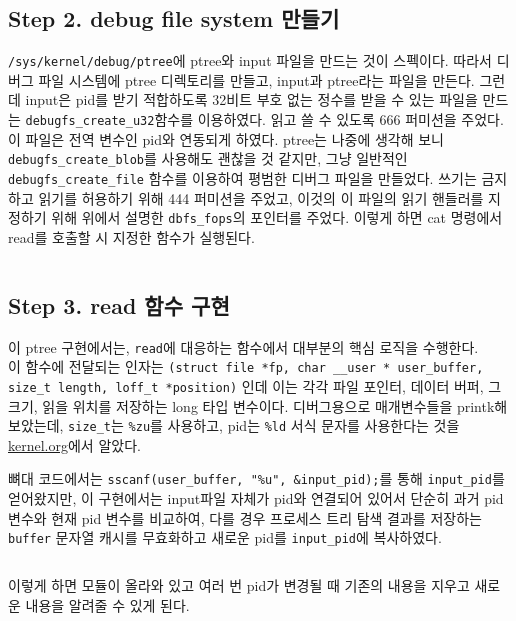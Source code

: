 \documentclass{report}
\begin{document}
\inputminted[firstline=147,lastline=147, linenos, breaklines]{C}{../kernellab-handout-done/ptree/dbfs_ptree.c}
\inputminted[firstline=125,lastline=128, linenos, breaklines]{C}{../kernellab-handout-done/ptree/dbfs_ptree.c}

\subsection{Step 2. debug file system 만들기}
\lstinline{/sys/kernel/debug/ptree}에 ptree와 input 파일을 만드는 것이 스펙이다. 따라서 디버그 파일 시스템에 ptree 디렉토리를 만들고, input과 ptree라는 파일을 만든다. 그런데 input은 pid를 받기 적합하도록 32비트 부호 없는 정수를 받을 수 있는 파일을 만드는 \lstinline{debugfs_create_u32}함수를 이용하였다. 읽고 쓸 수 있도록 666 퍼미션을 주었다. 이 파일은 전역 변수인 pid와 연동되게 하였다. ptree는 나중에 생각해 보니 \lstinline{debugfs_create_blob}를 사용해도 괜찮을 것 같지만, 그냥 일반적인 \lstinline{debugfs_create_file} 함수를 이용하여 평범한 디버그 파일을 만들었다. 쓰기는 금지하고 읽기를 허용하기 위해 444 퍼미션을 주었고, 이것의 이 파일의 읽기 핸들러를 지정하기 위해 위에서 설명한 \lstinline{dbfs_fops}의 포인터를 주었다. 이렇게 하면 cat 명령에서 read를 호출할 시 지정한 함수가 실행된다.

\inputminted[firstline=130,lastline=157, linenos, breaklines]{C}{../kernellab-handout-done/ptree/dbfs_ptree.c}

\subsection{Step 3. read 함수 구현}
이 ptree 구현에서는, \lstinline{read}에 대응하는 함수에서 대부분의 핵심 로직을 수행한다. \\
이 함수에 전달되는 인자는 \lstinline{(struct file *fp, char __user * user_buffer, size_t length, loff_t *position)} 인데 이는 각각 파일 포인터, 데이터 버퍼, 그 크기, 읽을 위치를 저장하는 long 타입 변수이다. 디버그용으로 매개변수들을 printk해 보았는데, \lstinline{size_t}는 \lstinline{%zu}를 사용하고, pid는 \lstinline{%ld} 서식 문자를 사용한다는 것을 \href{https://www.kernel.org/doc/Documentation/printk-formats.txt}{kernel.org}에서 알았다.

뼈대 코드에서는 \lstinline{sscanf(user_buffer, "%u", &input_pid);}를 통해 \lstinline{input_pid}를 얻어왔지만, 이 구현에서는 input파일 자체가 pid와 연결되어 있어서 단순히 과거 pid 변수와 현재 pid 변수를 비교하여, 다를 경우 프로세스 트리 탐색 결과를 저장하는 \lstinline{buffer} 문자열 캐시를 무효화하고 새로운 pid를 \lstinline{input_pid}에 복사하였다.
\inputminted[firstline=16,lastline=30, linenos, breaklines,obeytabs=true,tabsize=4]{C}{../kernellab-handout-done/ptree/dbfs_ptree.c}
이렇게 하면 모듈이 올라와 있고 여러 번 pid가 변경될 때 기존의 내용을 지우고 새로운 내용을 알려줄 수 있게 된다.
\inputminted[firstline=31,lastline=36, linenos, breaklines,obeytabs=true,tabsize=4]{C}{../kernellab-handout-done/ptree/dbfs_ptree.c}
\end{document}
